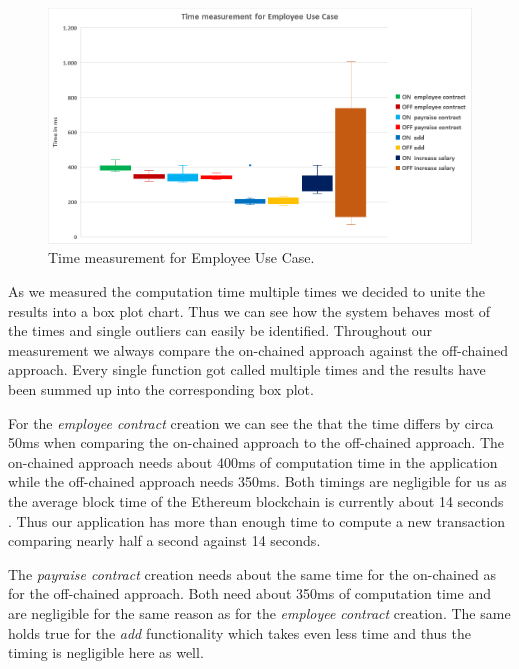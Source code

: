 \begin{figure}[t]%
\centering
\includegraphics[width=1.0\textwidth]{images/05_evaluation/05_time.png}
\caption{\label{fig:05_time}Time measurement for Employee Use Case.}
\end{figure}

As we measured the computation time multiple times we decided to unite the results into a box plot chart.
Thus we can see how the system behaves most of the times and single outliers can easily be identified.
Throughout our measurement we always compare the on-chained approach against the off-chained approach.
Every single function got called multiple times and the results have been summed up into the corresponding box plot.

For the \textit{employee contract} creation we can see the that the time differs by circa 50ms when comparing the on-chained approach to the off-chained approach.
The on-chained approach needs about 400ms of computation time in the application while the off-chained approach needs 350ms.
Both timings are negligible for us as the average block time of the Ethereum blockchain is currently about 14 seconds \cite{etherscan_blocktime}.
Thus our application has more than enough time to compute a new transaction comparing nearly half a second against 14 seconds.

The \textit{payraise contract} creation needs about the same time for the on-chained as for the off-chained approach.
Both need about 350ms of computation time and are negligible for the same reason as for the \textit{employee contract} creation.
The same holds true for the \textit{add} functionality which takes even less time and thus the timing is negligible here as well.

